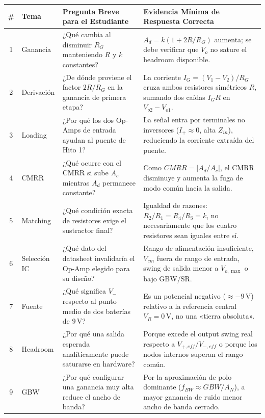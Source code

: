 \documentclass[10pt, a4paper]{article}
\begin{document}
\begin{table}[htbp]
    \centering
    \footnotesize
    \renewcommand{\arraystretch}{1.35}
    \begin{tabularx}{\textwidth}{|c|l|>{\raggedright\arraybackslash}p{6.2cm}|>{\raggedright\arraybackslash}X|}
    \hline
    \rowcolor[HTML]{EFEFEF} 
    \textbf{\#} & \textbf{Tema} & \textbf{Pregunta Breve para el Estudiante} & \textbf{Evidencia Mínima de Respuesta Correcta} \\ \hline
    1 & Ganancia & ¿Qué cambia al disminuir $R_G$ manteniendo $R$ y $k$ constantes? & $A_d = k(1 + 2R/R_G)$ aumenta; se debe verificar que $V_o$ no sature el headroom disponible. \\ \hline
    2 & Derivación & ¿De dónde proviene el factor $2R/R_G$ en la ganancia de primera etapa? & La corriente $I_G = (V_1-V_2)/R_G$ cruza ambos resistores simétricos $R$, sumando dos caídas $I_G R$ en $V_{o2}-V_{o1}$. \\ \hline
    3 & Loading & ¿Por qué los dos Op-Amps de entrada ayudan al puente de Hito 1? & La señal entra por terminales no inversores ($I_+ \approx 0$, alta $Z_{in}$), reduciendo la corriente extraída del puente. \\ \hline
    4 & CMRR & ¿Qué ocurre con el CMRR si sube $A_c$ mientras $A_d$ permanece constante? & Como $CMRR = |A_d/A_c|$, el CMRR disminuye y aumenta la fuga de modo común hacia la salida. \\ \hline
    5 & Matching & ¿Qué condición exacta de resistores exige el sustractor final? & Igualdad de razones: $R_2/R_1 = R_4/R_3 = k$, no necesariamente que los cuatro resistores sean iguales entre sí. \\ \hline
    6 & Selección IC & ¿Qué dato del datasheet invalidaría el Op-Amp elegido para su diseño? & Rango de alimentación insuficiente, $V_{cm}$ fuera de rango de entrada, swing de salida menor a $V_{o,\max}$ o bajo GBW/SR. \\ \hline
    7 & Fuente & ¿Qué significa $V_-$ respecto al punto medio de dos baterías de $9\,\text{V}$? & Es un potencial negativo ($\approx -9\,\text{V}$) relativo a la referencia central $V_R=0\,\text{V}$, no una «tierra absoluta». \\ \hline
    8 & Headroom & ¿Por qué una salida esperada analíticamente puede saturarse en hardware? & Porque excede el output swing real respecto a $V_{+,eff}/V_{-,eff}$ o porque los nodos internos superan el rango común. \\ \hline
    9 & GBW & ¿Por qué configurar una ganancia muy alta reduce el ancho de banda? & Por la aproximación de polo dominante ($f_{BW} \approx GBW / A_N$), a mayor ganancia de ruido menor ancho de banda cerrado. \\ \hline

\end{tabularx}
\end{table}
\end{document}
